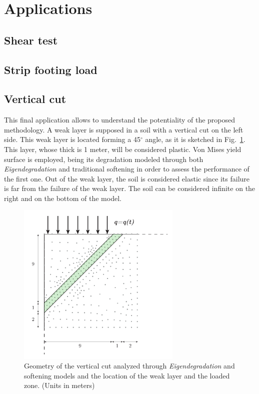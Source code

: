 \documentclass[applsci,journal,article,submit,moreauthors,pdftex]{Definitions/mdpi}
\begin{document}
\section{Applications}
\subsection{Shear test}
\subsection{Strip footing load}
\subsection{Vertical cut}
This final application allows to understand the potentiality of the proposed methodology. A weak layer is supposed in a soil with a vertical cut on the left side. This weak layer is located forming a 45$^\circ$ angle, as it is sketched in Fig.~\ref{fig_VC1}. This layer, whose thick is 1 meter, will be considered plastic. Von Mises yield surface is employed, being its degradation modeled through both \emph{Eigendegradation} and traditional softening in order to assess the performance of the first one. Out of the weak layer, the soil is considered elastic since its failure is far from the failure of the weak layer. The soil can be considered infinite on the right and on the bottom of the model.

\begin{figure}
\includegraphics[width=0.7\textwidth]{Figs/geo_VC.pdf}
\caption{Geometry of the vertical cut analyzed through \emph{Eigendegradation} and softening models and the location of the weak layer and the loaded zone. (Units in meters)}
\label{fig_VC1}
\end{figure}
\end{document}

